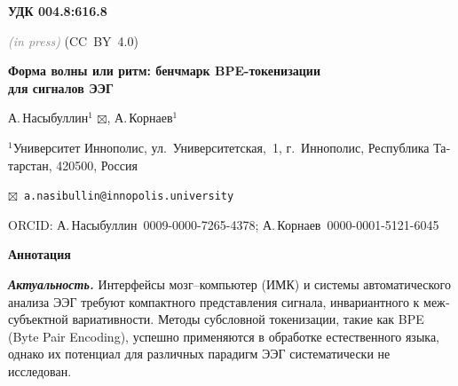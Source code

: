 \documentclass[14pt,a4paper]{extarticle}
\newcommand{\todo}[1]{\textit{\textcolor{gray}{\small (in press)}}}
\begin{document}

\begin{otherlanguage}{russian}

\begin{center}
\end{center}

\medskip

\noindent\textbf{УДК 004.8:616.8}

\noindent\todo{https://doi.org/10.21869/...} \hfill (CC~BY~4.0)

\bigskip

\begin{center}
{\large\bfseries
Форма волны или ритм: бенчмарк BPE-токенизации\\для сигналов ЭЭГ}

\medskip

А.\,Насыбуллин$^{1}$ $\boxtimes$,\quad
А.\,Корнаев$^{1}$
\end{center}

\medskip

\noindent$^{1}$Университет Иннополис, ул.~Университетская,~1,
г.~Иннополис, Республика Татарстан, 420500, Россия

\medskip

\noindent$\boxtimes$~\texttt{a.nasibullin@innopolis.university}

\noindent ORCID: А.\,Насыбуллин~0009-0000-7265-4378;
А.\,Корнаев~0000-0001-5121-6045

\medskip

\begin{mdframed}[backgroundcolor=gray!12, linewidth=0pt,
  innertopmargin=6pt, innerbottommargin=6pt,
  innerleftmargin=8pt, innerrightmargin=8pt]
\textbf{Аннотация}

\textbf{\textit{Актуальность.}}
Интерфейсы мозг--компьютер (ИМК) и системы автоматического анализа ЭЭГ
требуют компактного представления сигнала, инвариантного к межсубъектной
вариативности. Методы субсловной токенизации, такие как BPE (Byte Pair
Encoding), успешно применяются в обработке естественного языка, однако
их потенциал для различных парадигм ЭЭГ систематически не исследован.


\end{mdframed}
\end{otherlanguage}
\end{document}
